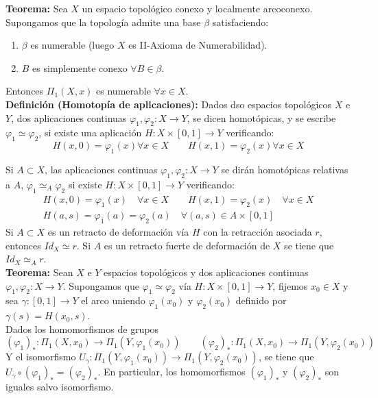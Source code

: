 \documentclass{article}
\begin{document}
\textbf{Teorema:} Sea $X$ un espacio topológico conexo y localmente arcoconexo. Supongamos que la topología admite una base $\beta$ satisfaciendo:
\begin{enumerate}
\item $\beta$ es numerable (luego $X$ es II-Axioma de Numerabilidad).

\item $B$ es simplemente conexo $\forall B\in \beta$.
\end{enumerate}
Entonces $\Pi_1(X,x)$ es numerable $\forall x\in X$. \\

\textbf{Definición (Homotopía de aplicaciones):} Dados dso espacios topológicos $X$ e $Y$, dos aplicaciones continuas $\varphi_1,\varphi_2:X\rightarrow Y$, se dicen homotópicas, y se escribe $\varphi_1\simeq \varphi_2$, si existe una aplicación $H:X\times [0,1]\rightarrow Y$ verificando:
\begin{equation*}
H(x,0)=\varphi_1(x)\forall x\in X\qquad H(x,1)=\varphi_2(x)\forall x\in X
\end{equation*}

Si $A\subset X$, las aplicaciones continuas $\varphi_1,\varphi_2:X\rightarrow Y$ se dirán homotópicas relativas a $A$, $\varphi_1\simeq_A\varphi_2$ si existe $H:X\times [0,1]\rightarrow Y$ verificando:
\begin{gather*}
H(x,0)=\varphi_1(x)\quad \forall x\in X\qquad H(x,1)=\varphi_2(x)\quad \forall x\in X\\
H(a,s)=\varphi_1(a)=\varphi_2(a)\quad \forall(a,s)\in A\times [0,1]
\end{gather*}
Si $A\subset X$ es un retracto de deformación vía $H$ con la retracción asociada $r$, entonces $Id_X\simeq r$. Si $A$ es un retracto fuerte de deformación de $X$ se tiene que $Id_X\simeq_A r$.\\

\textbf{Teorema:} Sean $X$ e $Y$ espacios topológicos y dos aplicaciones continuas $\varphi_1,\varphi_2:X\rightarrow Y$. Supongamos que $\varphi_1\simeq\varphi_2$ vía $H:X\times [0,1]\rightarrow Y$, fijemos $x_0\in X$ y sea $\gamma:[0,1]\rightarrow Y$ el arco uniendo $\varphi_1(x_0)$ y $\varphi_2(x_0)$ definido por $\gamma(s)=H(x_0,s)$. \\

Dados los homomorfismos de grupos
\begin{equation*}
(\varphi_1)_*:\Pi_1(X,x_0)\rightarrow \Pi_1(Y,\varphi_1(x_0))\qquad (\varphi_2)_*:\Pi_1(X,x_0)\rightarrow \Pi_1(Y,\varphi_2(x_0))
\end{equation*}
Y el isomorfismo $U_\gamma:\Pi_1(Y,\varphi_1(x_0))\rightarrow \Pi_1(Y,\varphi_2(x_0))$, se tiene que $U_\gamma\circ (\varphi_1)_*=(\varphi_2)_*$. En particular, los homomorfismos $(\varphi_1)_*$ y $(\varphi_2)_*$ son iguales salvo isomorfismo. \\
\end{document}
